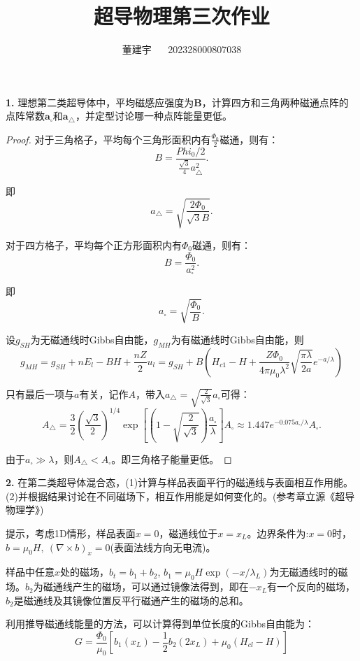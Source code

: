 \documentclass[reqno,a4paper,12pt]{amsart}
\title{超导物理第三次作业}
\author{董建宇 ~~ 202328000807038}
\begin{document}
\maketitle

\textbf{1.} 理想第二类超导体中，平均磁感应强度为$\mathbf{B}$，计算四方和三角两种磁通点阵的点阵常数$\mathbf{a}_\square$和$\mathbf{a}_\triangle$，并定型讨论哪一种点阵能量更低。

\begin{proof}
对于三角格子，平均每个三角形面积内有$\frac{\Phi_0}{2}$磁通，则有：
\[
	B = \frac{Phi_0/2}{\frac{\sqrt{3}}{4}a_\triangle^2}.
\]

即
\[
	a_\triangle = \sqrt{\frac{2\Phi_0}{\sqrt{3}B}}.
\]

对于四方格子，平均每个正方形面积内有$\Phi_0$磁通，则有：
\[
	B = \frac{\Phi_0}{a_\square^2}.
\]

即
\[
	a_\square = \sqrt{\frac{\Phi_0}{B}}.
\]

设$g_{SH}$为无磁通线时Gibbs自由能，$g_{MH}$为有磁通线时Gibbs自由能，则
\[
	g_{MH} = g_{SH} + nE_l - BH + \frac{nZ}{2}u_l = g_{SH} + B \left( H_{c1} - H + \frac{Z\Phi_0}{4\pi\mu_0\lambda^2} \sqrt{\frac{\pi\lambda}{2a}} e^{-a/\lambda} \right)
\]

只有最后一项与$a$有关，记作$A$，带入$a_\triangle = \sqrt{\frac{2}{\sqrt{3}}}a_\square$可得：
\[
	A_\triangle = \frac{3}{2}\left( \frac{\sqrt{3}}{2} \right)^{1/4} \exp\left[ \left( 1-\sqrt{\frac{2}{\sqrt{3}}} \right) \frac{a_\square}{\lambda} \right] A_\square \approx 1.447 e^{-0.075a_\square/\lambda} A_{\square}.
\]

由于$a_\square \gg \lambda$，则$A_{\triangle} < A_\square$。即三角格子能量更低。
\end{proof}

\medskip

\textbf{2.} 在第二类超导体混合态，(1)计算与样品表面平行的磁通线与表面相互作用能。(2)并根据结果讨论在不同磁场下，相互作用能是如何变化的。(参考章立源《超导物理学》)

提示，考虑1D情形，样品表面$x=0$，磁通线位于$x=x_L$。边界条件为:$x=0$时，$b=\mu_0 H, \ (\nabla\times b)_x = 0$(表面法线方向无电流)。

样品中任意$x$处的磁场，$b_t = b_1 + b_2$, $b_1 = \mu_0 H \exp(-x/\lambda_L)$为无磁通线时的磁场。$b_2$为磁通线产生的磁场，可以通过镜像法得到，即在$-x_L$有一个反向的磁场，$b_2$是磁通线及其镜像位置反平行磁通产生的磁场的总和。

利用推导磁通线能量的方法，可以计算得到单位长度的Gibbs自由能为：
\[
	G = \frac{\Phi_0}{\mu_0}\left[ b_1(x_L) - \frac{1}{2}b_2(2x_L) + \mu_0(H_{cl} - H) \right]
\]
\end{document}
